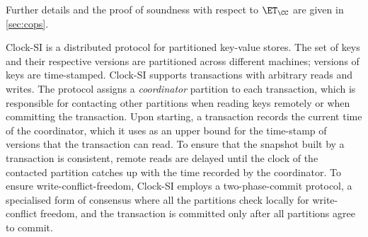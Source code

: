 Further details  and  the  proof of soundness with
respect to $\ET_\CC$  are given in \cref{sec:cops}.

Clock-SI is a distributed protocol for partitioned key-value
stores. The set of keys  and 
their respective versions are partitioned across different machines; versions of keys are time-stamped. 
Clock-SI supports transactions with arbitrary reads and writes. 
The protocol assigns a \emph{coordinator} partition to each transaction, which    
is responsible for contacting other partitions when reading keys remotely or 
when committing the transaction. Upon starting, a transaction records 
the current time of the coordinator, which it uses as an upper bound for the time-stamp 
of versions that the transaction can read. To ensure that the snapshot built by a transaction is consistent, 
remote reads are delayed until the clock of the contacted partition catches up with the time recorded by 
the coordinator. To ensure write-conflict-freedom, Clock-SI employs a two-phase-commit protocol, a specialised 
form of consensus where all the partitions check locally for write-conflict freedom, and the transaction 
is committed only after all partitions agree to commit.

